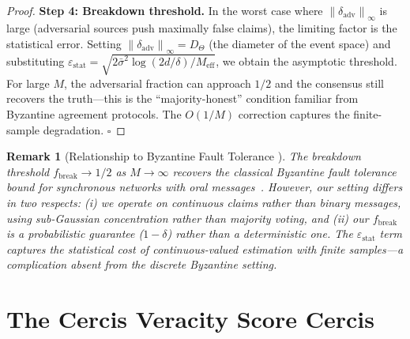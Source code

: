 \documentclass[11pt,a4paper]{article}
\newtheorem{remark}[theorem]{Remark}
\theoremstyle{definition}
\newcommand{\norm}[1]{\left\lVert#1\right\rVert}
\begin{document}
\begin{proof}
\textbf{Step 4: Breakdown threshold.} In the worst case where $\norm{\delta_{\mathrm{adv}}}_\infty$ is large (adversarial sources push maximally false claims), the limiting factor is the statistical error. Setting $\norm{\delta_{\mathrm{adv}}}_\infty = D_\Theta$ (the diameter of the event space) and substituting $\varepsilon_{\mathrm{stat}} = \sqrt{2\bar{\sigma}^2 \log(2d/\delta) / M_{\mathrm{eff}}}$, we obtain the asymptotic threshold. For large $M$, the adversarial fraction can approach $1/2$ and the consensus still recovers the truth---this is the ``majority-honest'' condition familiar from Byzantine agreement protocols. The $O(1/M)$ correction captures the finite-sample degradation. $\square$
\end{proof}

\begin{remark}[Relationship to Byzantine Fault Tolerance ]
The breakdown threshold $f_{\mathrm{break}} \to 1/2$ as $M \to \infty$ recovers the classical Byzantine fault tolerance bound for synchronous networks with oral messages~\cite{lamport1982}. However, our setting differs in two respects: (i) we operate on continuous claims rather than binary messages, using sub-Gaussian concentration rather than majority voting, and (ii) our $f_{\mathrm{break}}$ is a probabilistic guarantee ($1 - \delta$) rather than a deterministic one. The $\varepsilon_{\mathrm{stat}}$ term captures the statistical cost of continuous-valued estimation with finite samples---a complication absent from the discrete Byzantine setting.
\end{remark}

\section{The Cercis Veracity Score Cercis}
\label{sec:cercis}
\end{document}
